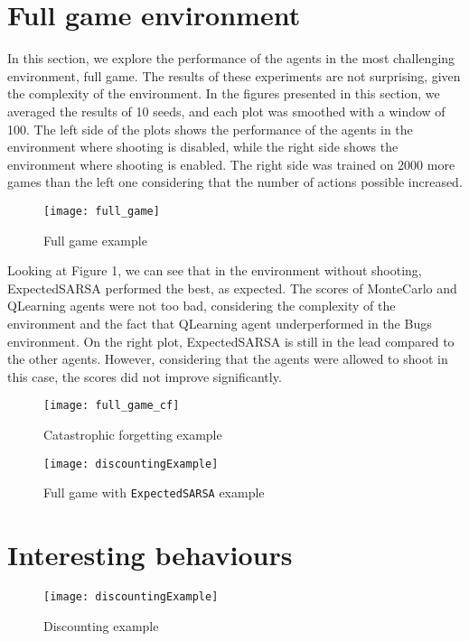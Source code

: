 \section{Full game environment}
In this section, we explore the performance of the agents in the most challenging environment, full game. The results of these experiments are not surprising, given the complexity of the environment. In the figures presented in this section, we averaged the results of 10 seeds, and each plot was smoothed with a window of 100. The left side of the plots shows the performance of the agents in the environment where shooting is disabled, while the right side shows the environment where shooting is enabled. The right side was trained on 2000 more games than the left one considering that the number of actions possible increased.

\begin{figure}[h]
    \centering
    \texttt{[image: full\_game]}
    \caption{Full game example}
    \label{fig:full_game_eg}
\end{figure}

Looking at Figure 1, we can see that in the environment without shooting, ExpectedSARSA performed the best, as expected. The scores of MonteCarlo and QLearning agents were not too bad, considering the complexity of the environment and the fact that QLearning agent underperformed in the Bugs environment. On the right plot, ExpectedSARSA is still in the lead compared to the other agents. However, considering that the agents were allowed to shoot in this case, the scores did not improve significantly.

\begin{figure}[h]
    \centering
    \texttt{[image: full\_game\_cf]}
    \caption{Catastrophic forgetting example}
    \label{fig:full_game_cf_eg}
\end{figure}
\begin{figure}[h]
    \centering
    \texttt{[image: discountingExample]}
    \caption{Full game with \texttt{ExpectedSARSA} example}
    \label{fig:full_game_es_eg}
\end{figure}

\section{Interesting behaviours}
\label{intbeh}
\begin{figure}[h]
    \centering
    \texttt{[image: discountingExample]}
    \caption{Discounting example}
    \label{fig:discounting_eg}
\end{figure}

